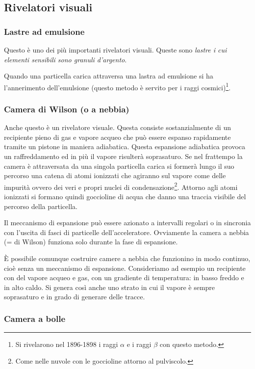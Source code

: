 \subsection{Rivelatori visuali}
\subsubsection{Lastre ad emulsione}
Questo è uno dei più importanti rivelatori visuali. Queste sono 
\textit{lastre i cui elementi sensibili sono granuli d'argento}.

Quando una particella carica attraversa una lastra ad emulsione si ha 
l'annerimento dell'emulsione (questo metodo è servito per i raggi 
cosmici)\footnote{Si rivelarono nel 1896-1898 i raggi $\alpha$ e i raggi 
$\beta$ con questo metodo.}.
\subsubsection{Camera di Wilson (o a nebbia)}

Anche questo è un rivelatore visuale. Questa consiste sostanzialmente di un 
recipiente pieno di gas e vapore acqueo che può essere espanso rapidamente 
tramite un pistone in maniera adiabatica. Questa espansione adiabatica provoca 
un raffreddamento ed in più il vapore risulterà soprasaturo. Se nel frattempo 
la camera è attraversata da una singola particella carica si formerà lungo il 
suo percorso una catena di atomi ionizzati che agiranno sul vapore come delle 
impurità ovvero dei veri e propri nuclei di condensazione\footnote{Come nelle 
nuvole con le goccioline attorno al pulviscolo. }. Attorno agli atomi ionizzati 
si formano quindi goccioline di acqua che danno una traccia visibile del 
percorso della particella.

Il meccanismo di espansione può essere azionato a intervalli regolari o in 
sincronia con l'uscita di fasci di particelle dell'acceleratore. Ovviamente la 
camera a nebbia (= di Wilson) funziona solo durante la fase di espansione.

\`E possibile comunque costruire camere a nebbia che funzionino in modo 
continuo, cioè senza un meccanismo di espansione. Consideriamo ad esempio un 
recipiente con del vapore acqueo e gas, con un gradiente di temperatura: in 
basso freddo e in alto caldo. Si genera così anche uno strato in cui il vapore 
è sempre soprasaturo e in grado di generare delle tracce.

\subsubsection{Camera a bolle}

